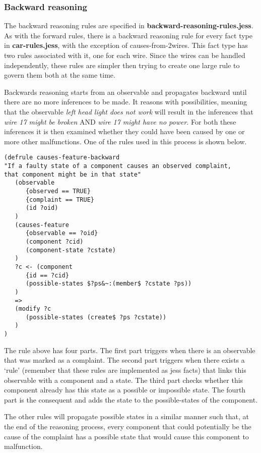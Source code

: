 \subsubsection{Backward reasoning}
The backward reasoning rules are specified in \textbf{backward-reasoning-rules.jess}. As with the forward rules, there is a backward reasoning rule for every fact type in \textbf{car-rules.jess}, with the exception of causes-from-2wires. This fact type has two rules associated with it, one for each wire. Since the wires can be handled independently, these rules are simpler then trying to create one large rule to govern them both at the same time.

Backwards reasoning starts from an observable and propagates backward until there are no more inferences to be made. It reasons with possibilities, meaning that the observable \emph{left head light does not work} will result in the inferences that \emph{wire 17 might be broken} AND \emph{wire 17 might have no power}. For both these inferences it is then examined whether they could have been caused by one or more other malfunctions. One of the rules used in this process is shown below.

\begin{verbatim}
(defrule causes-feature-backward
"If a faulty state of a component causes an observed complaint, 
that component might be in that state"
   (observable
      {observed == TRUE}
      {complaint == TRUE}
      (id ?oid)
   )
   (causes-feature
      {observable == ?oid}
      (component ?cid)
      (component-state ?cstate)
   )
   ?c <- (component
      {id == ?cid}
      (possible-states $?ps&~:(member$ ?cstate ?ps))
   )
   =>
   (modify ?c
      (possible-states (create$ ?ps ?cstate))
   )
)
\end{verbatim}

The rule above has four parts. The first part triggers when there is an observable that was marked as a complaint. The second part triggers when there exists a `rule' (remember that these rules are implemented as jess facts) that links this observable with a component and a state. The third part checks whether this component already has this state as a possible or impossible state. The fourth part is the consequent and adds the state to the possible-states of the component.

The other rules will propagate possible states in a similar manner such that, at the end of the reasoning process, every component that could potentially be the cause of the complaint has a possible state that would cause this component to malfunction.

